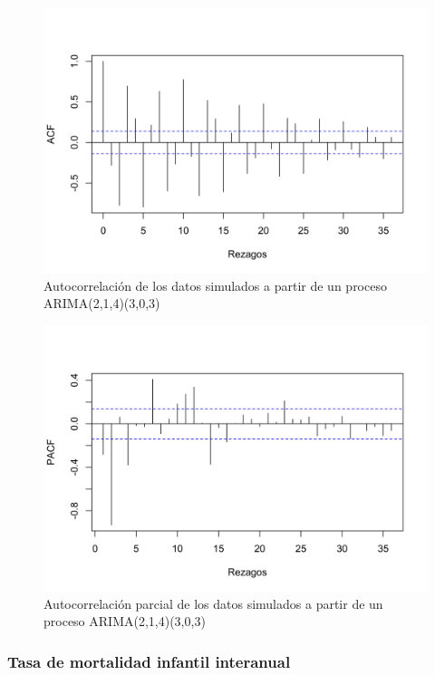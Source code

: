 \documentclass[
]{article}
\begin{document}
\begin{figure}[H]
\includegraphics[width=1\linewidth,height=1\textheight]{Tesis_files/figure-latex/arima214_303_acf-1} \caption{Autocorrelación de los datos simulados a partir de un proceso ARIMA(2,1,4)(3,0,3)}\label{fig:arima214_303_acf}
\end{figure}

\begin{figure}[H]
\includegraphics[width=1\linewidth,height=1\textheight]{Tesis_files/figure-latex/arima214_303_pacf-1} \caption{Autocorrelación parcial de los datos simulados a partir de un proceso ARIMA(2,1,4)(3,0,3)}\label{fig:arima214_303_pacf}
\end{figure}

\subsubsection{Tasa de mortalidad infantil interanual}
\end{document}
